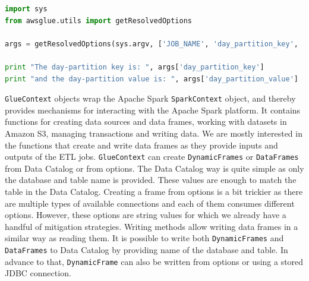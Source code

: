 \begin{lstlisting}[language=Python,caption=Usage of \texttt{getResolvedOptions} function,label=fig:resolvedOptions]
import sys
from awsglue.utils import getResolvedOptions

args = getResolvedOptions(sys.argv, ['JOB_NAME', 'day_partition_key', 'hour_partition_key', 'day_partition_value', 'hour_partition_value'])

print "The day-partition key is: ", args['day_partition_key']
print "and the day-partition value is: ", args['day_partition_value']
\end{lstlisting}
\par
\texttt{GlueContext} objects wrap the Apache Spark \texttt{SparkContext} object, and thereby provides mechanisms for interacting with the Apache Spark platform. It contains functions for creating data sources and data frames, working with datasets in Amazon S3, managing transactions and writing data. We are mostly interested in the functions that create and write data frames as they provide inputs and outputs of the ETL jobs. \texttt{GlueContext} can create \texttt{DynamicFrames} or \texttt{DataFrames} from Data Catalog or from options. The Data Catalog way is quite simple as only the database and table name is provided. These values are enough to match the table in the Data Catalog. Creating a frame from options is a bit trickier as there are multiple types of available connections and each of them consumes different options. However, these options are string values for which we already have a handful of mitigation strategies. Writing methods allow writing data frames in a similar way as reading them. It is possible to write both \texttt{DynamicFrames} and \texttt{DataFrames} to Data Catalog by providing name of the database and table. In advance to that, \texttt{DynamicFrame} can also be written from options or using a stored JDBC connection.
\par
